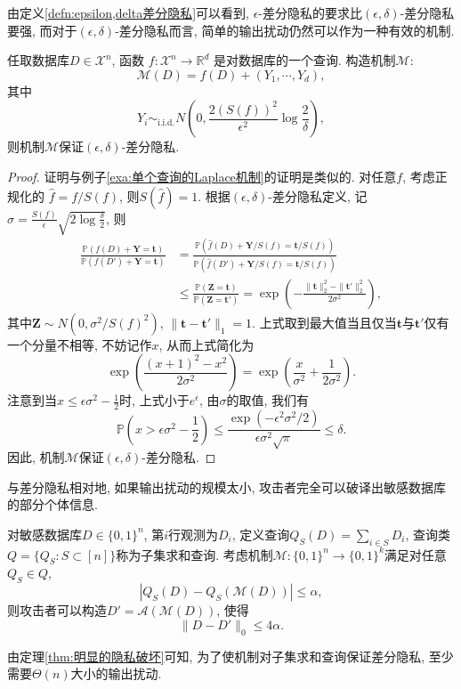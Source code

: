 由定义\ref{defn:epsilon,delta差分隐私}可以看到, $\epsilon$-差分隐私的要求比$(\epsilon, \delta)$-差分隐私要强, 而对于$(\epsilon, \delta)$-差分隐私而言, 简单的输出扰动仍然可以作为一种有效的机制. 

\begin{example}\label{exa:单个查询的Gauss机制}
  任取数据库$D \in \mathcal{X}^n$, 函数 $f : \mathcal{X}^n \to \mathbb R^d$ 是对数据库的一个查询. 构造机制$\mathcal{M}$:
  \[
  \mathcal{M}(D) = f(D) + (Y_1, \cdots, Y_d),
  \]
  其中
  \[
  Y_i \sim_{\text{i.i.d.}} N\left(0, \frac{2(S(f))^2}{\epsilon^2}\log\frac{2}{\delta}\right),
  \] 
  则机制$\mathcal{M}$保证$(\epsilon, \delta)$-差分隐私.
\end{example}
\begin{proof}
  证明与例子\ref{exa:单个查询的Laplace机制}的证明是类似的. 对任意$f$, 考虑正规化的 $\hat{f} = f / S(f)$, 则$S(\hat{f}) = 1$. 根据$(\epsilon, \delta)$-差分隐私定义, 记$\sigma = \frac{S(f)}{\epsilon}\sqrt{2\log\frac{\delta}{2}}$, 则
  \[
  \begin{split}
    \frac{\mathbb{P}(f(D) + \mathbf{Y} = \mathbf{t})}{\mathbb{P}(f(D') + \mathbf{Y} = \mathbf{t})} &= \frac{\mathbb{P}(\hat{f}(D) + \mathbf{Y}/ S(f) = \mathbf{t}/S(f))}{\mathbb{P}(\hat{f}(D') + \mathbf{Y}/S(f) = \mathbf{t}/S(f))} \\
    &\le \frac{\mathbb{P}(\mathbf{Z} = \mathbf{t})}{\mathbb{P}(\mathbf{Z} = \mathbf{t'})} = \exp\left(- \frac{\|\mathbf{t}\|_2^2 - \|\mathbf{t}'\|_2^2}{2\sigma^2} \right),
  \end{split}
  \]
  其中$\mathbf{Z} \sim N(0, \sigma^2/S(f)^2)$, $\|\mathbf{t} - \mathbf{t}'\|_1 = 1$. 上式取到最大值当且仅当$\mathbf{t}$与$\mathbf{t}'$仅有一个分量不相等, 不妨记作$x$, 从而上式简化为
  \[
  \exp\left( \frac{(x + 1)^2 - x^2}{2\sigma^2} \right) = \exp \left(\frac{x}{\sigma^2} + \frac{1}{2\sigma^2} \right).
  \]
  注意到当$x\le\epsilon\sigma^2 - \frac{1}{2}$时, 上式小于$e^\epsilon$, 由$\sigma$的取值, 我们有
  \[
  \mathbb{P}\left(x > \epsilon \sigma^2 - \frac{1}{2} \right) \le \frac{\exp(-\epsilon^2\sigma^2/2)}{\epsilon\sigma^2\sqrt{\pi}} \le \delta.
  \]
  因此, 机制$\mathcal{M}$保证$(\epsilon, \delta)$-差分隐私.
\end{proof}

与差分隐私相对地, 如果输出扰动的规模太小, 攻击者完全可以破译出敏感数据库的部分个体信息.
\begin{thm}\label{thm:明显的隐私破坏}
  对敏感数据库$D \in \{0, 1\}^n$, 第$i$行观测为$D_i$, 定义查询$Q_S(D) = \sum_{i\in S} D_i$, 查询类$Q = \{Q_S\colon S\subset[n]\}$称为子集求和查询. 考虑机制$\mathcal{M}\colon \{0, 1\}^n \to \{0, 1\}^k$满足对任意$Q_S \in Q$, 
  \[
    |Q_S(D) - Q_S(\mathcal{M}(D))| \le \alpha,
  \]
  则攻击者可以构造$D' = \mathcal{A}(\mathcal{M}(D))$, 使得
  \[
    \|D - D'\|_0 \le 4\alpha.
  \]
\end{thm}
由定理\ref{thm:明显的隐私破坏}可知, 为了使机制对子集求和查询保证差分隐私, 至少需要$\Theta(n)$大小的输出扰动.

